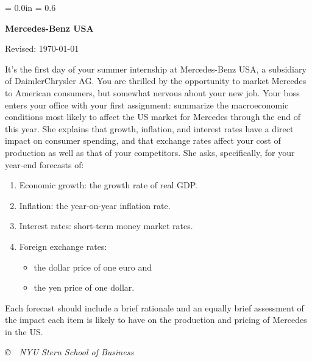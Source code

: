 \documentclass[letterpaper,12pt]{article}
\def\HeadName{Mercedes-Benz USA}
\begin{document}
\parindent = 0.0in
\parskip = 0.6\bigskipamount
\thispagestyle{empty}%
\Head

\centerline{\large \bf \HeadName}%
\centerline{Revised:  \today}

\medskip
It's the first day of your summer internship at Mercedes-Benz USA,
a subsidiary of DaimlerChrysler AG.
You are thrilled by the opportunity to market Mercedes to American consumers,
but somewhat nervous about your new job.
Your boss enters your office with your first assignment:
summarize the macroeconomic conditions most likely to affect
the US market for Mercedes through the end of this year.
She explains that growth, inflation, and interest rates
have a direct impact on consumer spending,
and that exchange rates affect your cost of production
as well as that of your competitors.
She asks, specifically, for your year-end forecasts of:
%
\begin{enumerate}
\bigskipamount
{}\bigskipamount

\item Economic growth:
the growth rate of real GDP.

\item Inflation:
the year-on-year inflation rate.

\item Interest rates:  short-term money market rates.

\item Foreign exchange rates:
\begin{itemize}
\item the dollar price of one euro and
\item the yen price of one dollar.
\end{itemize}

\end{enumerate}
Each forecast should include a brief rationale
and an equally brief assessment of the impact each item is likely to have on the production and pricing of Mercedes in the US.


\vfill \centerline{\it \copyright \ \number\year \ NYU Stern
School of Business}
\end{document}
